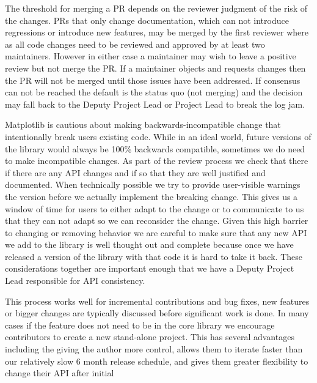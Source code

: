 \documentclass[12pt]{article}
\numberwithin{page}{section}
\begin{document}
The threshold for merging a PR depends on the reviewer judgment of the
risk of the changes.  PRs that only change documentation, which can
not introduce regressions or introduce new features, may be merged by
the first reviewer where as all code changes need to be reviewed and
approved by at least two maintainers.  However in either case a
maintainer may wish to leave a positive review but not merge the PR.
If a maintainer objects and requests changes then the PR will not be
merged until those issues have been addressed.  If consensus can not
be reached the default is the status quo (not merging) and the
decision may fall back to the Deputy Project Lead or Project Lead to
break the log jam.

Matplotlib is cautious about making backwards-incompatible change that
intentionally break users existing code.  While in an ideal world,
future versions of the library would always be 100\% backwards
compatible, sometimes we do need to make incompatible changes.  As
part of the review process we check that there if there are any API
changes and if so that they are well justified and documented.  When
technically possible we try to provide user-visible warnings the
version before we actually implement the breaking change.  This gives
us a window of time for users to either adapt to the change or to
communicate to us that they can not adapt so we can reconsider the
change.  Given this high barrier to changing or removing behavior we
are careful to make sure that any new API we add to the library is
well thought out and complete because once we have released a version
of the library with that code it is hard to take it back.  These
considerations together are important enough that we have a Deputy
Project Lead responsible for API consistency.

This process works well for incremental contributions and bug fixes,
new features or bigger changes are typically discussed before
significant work is done.  In many cases if the feature does not need
to be in the core library we encourage contributors to create a new
stand-alone project.  This has several advantages including the giving
the author more control, allows them to iterate faster than our
relatively slow 6 month release schedule, and gives them greater
flexibility to change their API after initial


\newpage

\def\ref@jnl#1{{\rm#1}}
\end{document}
